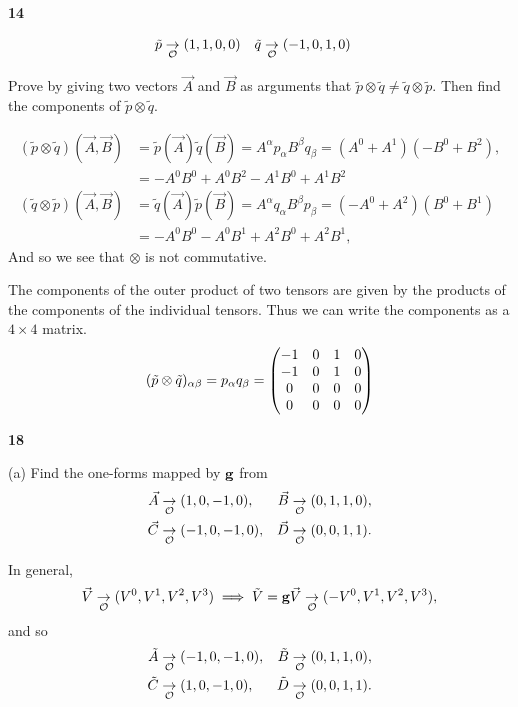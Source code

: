 \documentclass[gr-notes.tex]{subfiles}
\begin{document}
\textbf{14}

\begin{align*}
  \tilde{p} &\underset{\mathcal{O}}{\to} ( 1, 1, 0, 0) &
  \tilde{q} &\underset{\mathcal{O}}{\to} (-1, 0, 1, 0)
\end{align*}

Prove by giving two vectors $\vec{A}$ and $\vec{B}$ as arguments that $\tilde{p} \otimes \tilde{q} \neq \tilde{q} \otimes \tilde{p}$. Then find the components of $\tilde{p} \otimes \tilde{q}$.

\begin{align*}
  (\tilde{p} \otimes \tilde{q})(\vec{A}, \vec{B}) &=
  \tilde{p}(\vec{A}) \tilde{q}(\vec{B}) =
  A^\alpha p_\alpha B^\beta q_\beta =
  (A^0 + A^1) (-B^0 + B^2),
  \\ &=
  -A^0 B^0 + A^0 B^2 - A^1 B^0 + A^1 B^2
  \\
  (\tilde{q} \otimes \tilde{p})(\vec{A}, \vec{B}) &=
  \tilde{q}(\vec{A}) \tilde{p}(\vec{B}) =
  A^\alpha q_\alpha B^\beta p_\beta =
  (-A^0 + A^2) (B^0 + B^1)
  \\ &=
  -A^0 B^0 - A^0 B^1 + A^2 B^0 + A^2 B^1,
\end{align*}
%
And so we see that $\otimes$ is not commutative.

The components of the outer product of two tensors are given by the products of the components of the individual tensors. Thus we can write the components as a $4 \times 4$ matrix.
%
\begin{displaymath}
  (\tilde{p} \otimes \tilde{q})_{\alpha\beta} =
  p_\alpha q_\beta =
  \mqty(-1 &  0 &  1 &  0 \\
        -1 &  0 &  1 &  0 \\
         0 &  0 &  0 &  0 \\
         0 &  0 &  0 &  0)
\end{displaymath}




\textbf{18}

(a)
Find the one-forms mapped by $\vb{g}$ from
%
\begin{align*}
  \vec{A} &\underset{\mathcal{O}}{\to} ( 1,  0, -1,  0), &
  \vec{B} &\underset{\mathcal{O}}{\to} ( 0,  1,  1,  0), \\
  \vec{C} &\underset{\mathcal{O}}{\to} (-1,  0, -1,  0), &
  \vec{D} &\underset{\mathcal{O}}{\to} ( 0,  0,  1,  1).
\end{align*}

In general,
%
\begin{displaymath}
  \vec{V} \underset{\mathcal{O}}{\to} (V^0, V^1, V^2, V^3) \implies
  \tilde{V} =
  \vb{g} \vec{V} \underset{\mathcal{O}}{\to} (-V^0, V^1, V^2, V^3),
\end{displaymath}
%
and so
%
\begin{align*}
  \tilde{A} &\underset{\mathcal{O}}{\to} (-1,  0, -1,  0), &
  \tilde{B} &\underset{\mathcal{O}}{\to} ( 0,  1,  1,  0), \\
  \tilde{C} &\underset{\mathcal{O}}{\to} ( 1,  0, -1,  0), &
  \tilde{D} &\underset{\mathcal{O}}{\to} ( 0,  0,  1,  1).
\end{align*}
\end{document}
